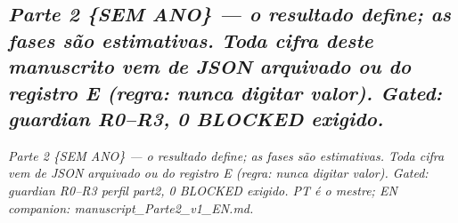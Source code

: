 \documentclass[
  10pt,
]{article}
\begin{document}
\hypertarget{parte-2-sem-ano-o-resultado-define-as-fases-suxe3o-estimativas.-toda-cifra-deste-manuscrito-vem-de-json-arquivado-ou-do-registro-e-regra-nunca-digitar-valor.-gated-guardian-r0r3-0-blocked-exigido.}{%
\subsection{\texorpdfstring{\emph{Parte 2 \{SEM ANO\} --- o resultado
define; as fases são estimativas. Toda cifra deste manuscrito vem de
JSON arquivado ou do registro E (regra: nunca digitar valor). Gated:
guardian R0--R3, 0 BLOCKED
exigido.}}{Parte 2 \{SEM ANO\} --- o resultado define; as fases são estimativas. Toda cifra deste manuscrito vem de JSON arquivado ou do registro E (regra: nunca digitar valor). Gated: guardian R0--R3, 0 BLOCKED exigido.}}\label{parte-2-sem-ano-o-resultado-define-as-fases-suxe3o-estimativas.-toda-cifra-deste-manuscrito-vem-de-json-arquivado-ou-do-registro-e-regra-nunca-digitar-valor.-gated-guardian-r0r3-0-blocked-exigido.}}

\emph{Parte 2 \{SEM ANO\} --- o resultado define; as fases são
estimativas. Toda cifra vem de JSON arquivado ou do registro E (regra:
nunca digitar valor). Gated: guardian R0--R3 perfil part2, 0 BLOCKED
exigido. PT é o mestre; EN companion: manuscript\_Parte2\_v1\_EN.md.}
\end{document}

